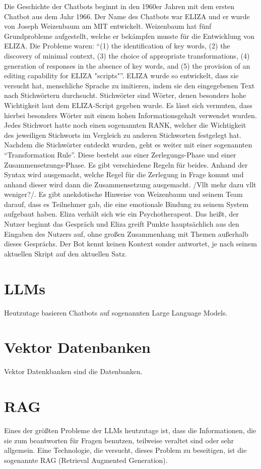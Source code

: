 Die Geschichte der Chatbots beginnt in den 1960er Jahren mit dem ersten Chatbot aus dem Jahr 1966. Der Name des Chatbots war ELIZA und er wurde von Joseph Weizenbaum am MIT entwickelt. Weizenbaum hat fünf Grundprobleme aufgestellt, welche er bekämpfen musste für die Entwicklung von ELIZA. Die Probleme waren: “(1) the identification of key words, (2) the discovery of minimal context, (3) the choice of appropriate transformations, (4) generation of responses in the absence of key words, and (5) the provision of an editing capability for ELIZA "scripts"”. ELIZA wurde so entwickelt, dass sie versucht hat, menschliche Sprache zu imitieren, indem sie den eingegebenen Text nach Stichwörtern durchsucht. Stichwörter sind Wörter, denen besonders hohe Wichtigkeit laut dem ELIZA-Script gegeben wurde. Es lässt sich vermuten, dass hierbei besonders Wörter mit einem hohen Informationsgehalt verwendet wurden. Jedes Stichwort hatte noch einen sogenannten RANK, welcher die Wichtigkeit des jeweiligen Stichworts im Vergleich zu anderen Stichworten festgelegt hat. Nachdem die Stichwörter entdeckt wurden, geht es weiter mit einer sogenannten “Transformation Rule”. Diese besteht aus einer Zerlegungs-Phase und einer Zusammensetzungs-Phase. Es gibt verschiedene Regeln für beides. Anhand der Syntax wird ausgemacht, welche Regel für die Zerlegung in Frage kommt und anhand dieser wird dann die Zusammensetzung ausgemacht. /Vllt mehr dazu vllt weniger?/. Es gibt anekdotische Hinweise von Weizenbaum und seinem Team darauf, dass es Teilnehmer gab, die eine emotionale Bindung zu seinem System aufgebaut haben. Eliza verhält sich wie ein Psychotherapeut. Das heißt, der Nutzer beginnt das Gespräch und Eliza greift Punkte hauptsächlich aus den Eingaben des Nutzers auf, ohne großen Zusammenhang mit Themen außerhalb dieses Gesprächs. Der Bot kennt keinen Kontext sonder antwortet, je nach seinem aktuellen Skript auf den aktuellen Satz.

\section{LLMs}
\label{s:intro:llm}
Heutzutage basieren Chatbots auf sogenannten Large Language Models. 

\section{Vektor Datenbanken}
\label{s:intro:dat}
Vektor Datenkbanken sind die Datenbanken.

\section{RAG}
\label{s:intro:rag}
Eines der größten Probleme der LLMs heutzutage ist, dass die Informationen, die sie zum beantworten für Fragen benutzen, teilweise veraltet sind oder sehr allgemein. Eine Technologie, die versucht, dieses Problem zu beseitigen, ist die sogenannte RAG (Retrieval Augmented Generation).  
